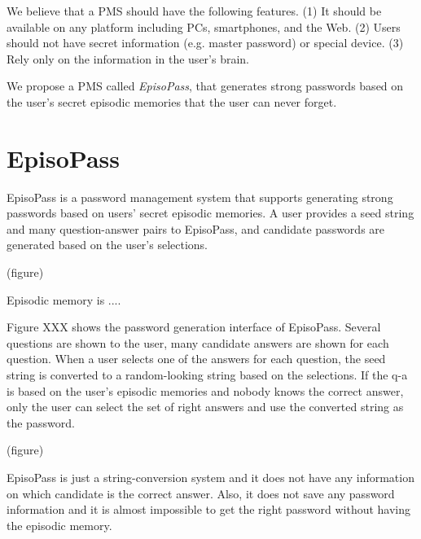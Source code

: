 \documentclass{article}
\begin{document}
%   

We believe that a PMS should have the following features.
(1) It should be available on any platform including PCs, smartphones, and the Web.
(2) Users should not have secret information (e.g. master password) or special device.
(3) Rely only on the information in the user's brain.

We propose a PMS called \textit{EpisoPass}, that generates strong passwords
based on the user's secret episodic memories that
the user can never forget.

\section{EpisoPass}

EpisoPass is a password management system that supports generating
strong passwords based on users' secret episodic memories.
A user provides a seed string and many question-answer pairs to EpisoPass,
and candidate passwords are generated based on the user's selections.

(figure)

Episodic memory is ....

Figure XXX shows the password generation interface of EpisoPass.
Several questions are shown to the user,
many candidate answers are shown for each question.
When a user selects one of the answers for each question,
the seed string is converted to a random-looking string
based on the selections.
If the q-a is based on the user's episodic memories and
nobody knows the correct answer,
only the user can select the set of right answers and
use the converted string as the password.

(figure)

EpisoPass is just a string-conversion system and it does not
have any information on which candidate is the correct answer.
Also, it does not save any password information and
it is almost impossible to get the right password 
without having the episodic memory.


% 
% 
%
\end{document}
